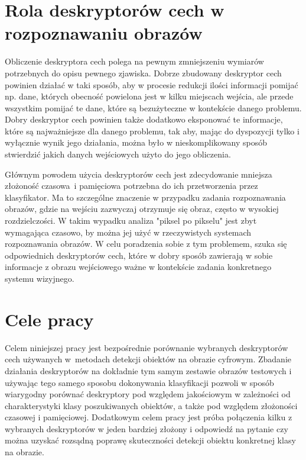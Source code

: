 
\section{Rola deskryptorów cech w rozpoznawaniu obrazów}
\label{sec:deskryptory}

Obliczenie deskryptora cech polega na pewnym zmniejszeniu wymiarów potrzebnych do opisu pewnego zjawiska. Dobrze zbudowany deskryptor cech powinien działać w taki sposób, aby w procesie redukcji ilości informacji pomijać np. dane, których obecność powielona jest w kilku miejscach wejścia, ale przede wszystkim pomijać te dane, które są bezużyteczne w kontekście danego problemu. Dobry deskryptor cech powinien także dodatkowo eksponować te informacje, które są najważniejsze dla danego problemu, tak aby, mając do dyspozycji tylko i wyłącznie wynik jego działania, można było w nieskomplikowany sposób stwierdzić jakich danych wejściowych użyto do jego obliczenia.

Głównym powodem użycia deskryptorów cech jest zdecydowanie mniejsza złożoność czasowa~i pamięciowa potrzebna do ich przetworzenia przez klasyfikator. Ma to szczególne znaczenie w przypadku zadania rozpoznawania obrazów, gdzie na wejściu zazwyczaj otrzymuje się obraz, często w wysokiej rozdzielczości. W takim wypadku analiza "piksel po pikselu" jest zbyt wymagająca czasowo, by można jej użyć w rzeczywistych systemach rozpoznawania obrazów. W celu poradzenia sobie z tym problemem, szuka się odpowiednich deskryptorów cech, które w dobry sposób zawierają w sobie informacje z obrazu wejściowego ważne w kontekście zadania konkretnego systemu wizyjnego.


\section{Cele pracy}
\label{sec:celePracy}

Celem niniejszej pracy jest bezpośrednie porównanie wybranych deskryptorów cech używanych w~metodach detekcji obiektów na obrazie cyfrowym. Zbadanie działania deskryptorów na dokładnie tym samym zestawie obrazów testowych i używając tego samego sposobu dokonywania klasyfikacji pozwoli w sposób wiarygodny porównać deskryptory pod względem jakościowym w zależności od charakterystyki klasy poszukiwanych obiektów, a także pod względem złożoności czasowej i pamięciowej. Dodatkowym celem pracy jest próba połączenia kilku z wybranych deskryptorów w jeden bardziej złożony i odpowiedź na pytanie czy można uzyskać rozsądną poprawę skuteczności detekcji obiektu konkretnej klasy na obrazie.


